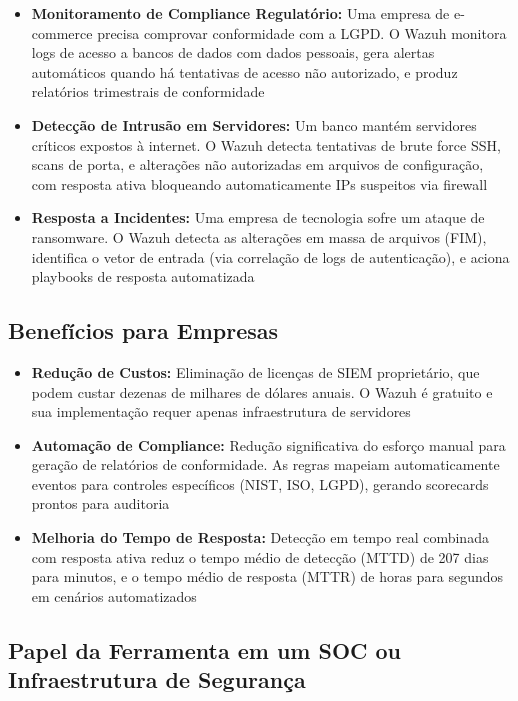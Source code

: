 \documentclass[12pt,a4paper]{article}
\begin{document}
    \begin{itemize}
        \item \textbf{Monitoramento de Compliance Regulatório:} Uma empresa de e-commerce precisa comprovar conformidade com a LGPD. O Wazuh monitora logs de acesso a bancos de dados com dados pessoais, gera alertas automáticos quando há tentativas de acesso não autorizado, e produz relatórios trimestrais de conformidade
        \item \textbf{Detecção de Intrusão em Servidores:} Um banco mantém servidores críticos expostos à internet. O Wazuh detecta tentativas de brute force SSH, scans de porta, e alterações não autorizadas em arquivos de configuração, com resposta ativa bloqueando automaticamente IPs suspeitos via firewall
        \item \textbf{Resposta a Incidentes:} Uma empresa de tecnologia sofre um ataque de ransomware. O Wazuh detecta as alterações em massa de arquivos (FIM), identifica o vetor de entrada (via correlação de logs de autenticação), e aciona playbooks de resposta automatizada
    \end{itemize}

    \subsection{Benefícios para Empresas}

    \begin{itemize}
        \item \textbf{Redução de Custos:} Eliminação de licenças de SIEM proprietário, que podem custar dezenas de milhares de dólares anuais. O Wazuh é gratuito e sua implementação requer apenas infraestrutura de servidores
        \item \textbf{Automação de Compliance:} Redução significativa do esforço manual para geração de relatórios de conformidade. As regras mapeiam automaticamente eventos para controles específicos (NIST, ISO, LGPD), gerando scorecards prontos para auditoria
        \item \textbf{Melhoria do Tempo de Resposta:} Detecção em tempo real combinada com resposta ativa reduz o tempo médio de detecção (MTTD) de 207 dias para minutos, e o tempo médio de resposta (MTTR) de horas para segundos em cenários automatizados
    \end{itemize}

    \subsection{Papel da Ferramenta em um SOC ou Infraestrutura de Segurança}
\end{document}

